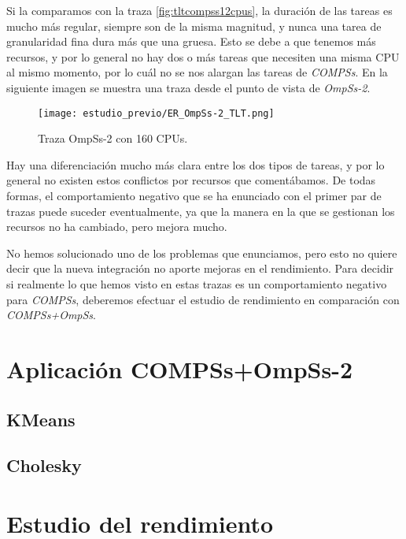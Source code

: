 Si la comparamos con la traza \ref{fig:tltcompss12cpus}, la duración de las tareas es mucho más regular, siempre son de la misma magnitud, y nunca una tarea de granularidad fina dura más que una gruesa. Esto se debe a que tenemos más recursos, y por lo general no hay dos o más tareas que necesiten una misma CPU al mismo momento, por lo cuál no se nos alargan las tareas de \textit{COMPSs}. En la siguiente imagen se muestra una traza desde el punto de vista de \textit{OmpSs-2}.

\begin{figure}[H]
	\centering 
	\caption{Traza OmpSs-2 con 160 CPUs.}
	\texttt{[image: estudio\_previo/ER\_OmpSs-2\_TLT.png]}
	\label{fig:tltompss160cpus}
\end{figure}

Hay una diferenciación mucho más clara entre los dos tipos de tareas, y por lo general no existen estos conflictos por recursos que comentábamos. De todas formas, el comportamiento negativo que se ha enunciado con el primer par de trazas puede suceder eventualmente, ya que la manera en la que se gestionan los recursos no ha cambiado, pero mejora mucho.
\par\bigskip
No hemos solucionado uno de los problemas que enunciamos, pero esto no quiere decir que la nueva integración no aporte mejoras en el rendimiento. Para decidir si realmente lo que hemos visto en estas trazas es un comportamiento negativo para \textit{COMPSs}, deberemos efectuar el estudio de rendimiento en comparación con \textit{COMPSs+OmpSs}.

\section{Aplicación COMPSs+OmpSs-2}

\subsection{KMeans}

\subsection{Cholesky}

\section{Estudio del rendimiento}

